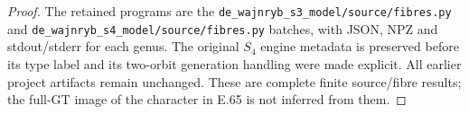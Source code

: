 \begin{proof}
The retained programs are the
\texttt{de\_wajnryb\_s3\_model/source/fibres.py} and
\texttt{de\_wajnryb\_s4\_model/source/fibres.py} batches,
with JSON, NPZ and stdout/stderr for each genus.
The original $S_4$ engine metadata is preserved before
its type label and its two-orbit generation handling
were made explicit.  All earlier project artifacts remain
unchanged.  These are complete finite source/fibre results;
the full-GT image of the character in E.65 is not inferred
from them.
\end{proof}
